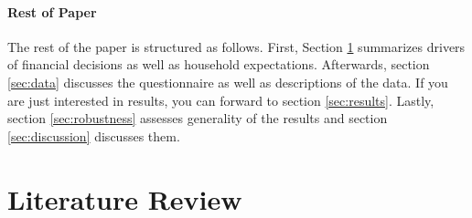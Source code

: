 \documentclass[ProjectABM]{subfiles}
\begin{document}


\paragraph{Rest of Paper}
The rest of the paper is structured as follows. First, Section \ref{sec:literature} summarizes drivers of financial decisions as well as household expectations. Afterwards, section \ref{sec:data} discusses the questionnaire as well as descriptions of the data. If you are just interested in results, you can forward to section \ref{sec:results}. Lastly, section \ref{sec:robustness} assesses generality of the results and section \ref{sec:discussion} discusses them.


\section{Literature Review}\label{sec:literature}
\end{document}
